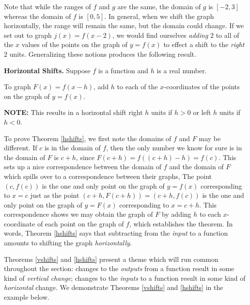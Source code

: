 \documentclass{ximera}
\begin{document}
Note that while the ranges of $f$ and $g$ are the same, the domain of $g$ is $[-2,3]$ whereas the domain of $f$ is $[0,5]$.  In general, when we shift the graph horizontally, the range will remain the same, but the domain could change.  If we set out to graph $j(x) = f(x-2)$, we would find ourselves \textit{adding} $2$ to all of the $x$ values of the points on the graph of $y=f(x)$ to effect a shift to the \emph{right} $2$ units. Generalizing these notions produces the following result.

\smallskip



\begin{theorem} \label{hshifts}\textbf{Horizontal Shifts.}  Suppose $f$ is a function and $h$ is a real number. 

To graph $F(x) = f(x-h)$,  add $h$ to each of the $x$-coordinates of the points on the graph of $y=f(x)$.

\textbf{NOTE:}  This results in a horizontal shift right $h$ units if $h > 0$ or left $h$ units if $h< 0$.

\end{theorem}


\smallskip

To prove Theorem \ref{hshifts}, we first note the domains of $f$ and $F$ may be different.   If $c$ is in the domain of $f$, then the only number we know for sure is in the domain of $F$ is  $c+h$, since $F(c+h) = f((c+h)-h) = f(c)$.  This sets up a nice correspondence between the domain of $f$ and the domain of $F$ which spills over to a correspondence between their graphs,  The point $(c, f(c))$ is the one and only point on the graph of $y = f(x)$ corresponding to $x=c$ just as the point $(c+h, F(c+h)) = (c+h, f(c))$ is the one and only point on the graph of $y = F(x)$ corresponding to $x=c+h$.  This correspondence shows we may obtain the graph of $F$ by adding $h$ to each $x$-coordinate of each point on the graph of $f$, which establishes the theorem. In words, Theorem \ref{hshifts} says that subtracting from the  \textit{input} to a function amounts to shifting the graph \textit{horizontally}. 

\smallskip

 Theorems \ref{vshifts} and \ref{hshifts} present a theme which will run common throughout the section:  changes to the \textit{outputs} from a function result in some kind of \textit{vertical change};  changes to the \textit{inputs} to a function result in some kind of \textit{horizontal} change.  We demonstrate  Theorems \ref{vshifts} and \ref{hshifts} in the example below.
 
\end{document}

